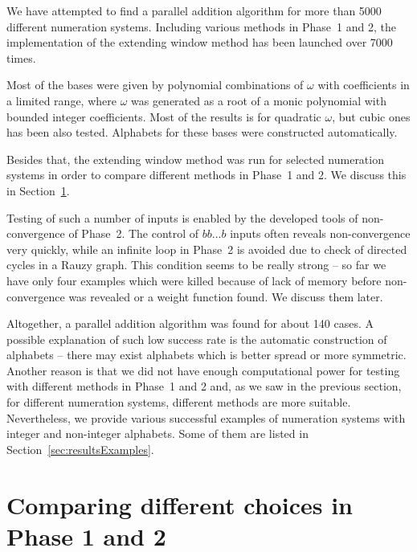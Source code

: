 We have attempted to find a parallel addition algorithm for more than 5000 different numeration systems. Including various methods in Phase~1 and 2, the implementation of the extending window method has been launched over 7000 times. 

Most of the bases were given by polynomial combinations of $\omega$ with coefficients in a limited range, where $\omega$ was generated as a root of a monic polynomial with bounded integer coefficients. Most of the results is for quadratic $\omega$, but cubic ones has been also tested. Alphabets for these bases were constructed automatically. 

Besides that, the extending window method was run for selected numeration systems in order to compare different methods in Phase~1 and 2. We discuss this in Section~\ref{sec:compareMethods}.

Testing of such a number of inputs is enabled by the developed tools of non-convergence of Phase~2. The control of $bb\dots b$ inputs often reveals non-convergence very quickly, while an infinite loop in Phase~2 is avoided due to check of directed cycles in a Rauzy graph. This condition seems to be really strong -- so far we have only four examples which were killed because of lack of memory before non-convergence was revealed or a weight function found. We discuss them later.

Altogether, a parallel addition algorithm was found for about 140 cases. A possible explanation of such low success rate is the automatic construction of alphabets -- there may exist  alphabets which is better spread or more symmetric. Another reason is that we did not have enough computational power for testing with different methods in Phase~1 and 2 and, as we saw in the previous section, for different numeration systems, different methods are more suitable.
Nevertheless, we provide various successful examples of numeration systems with integer and non-integer alphabets. Some of them are listed in Section~\ref{sec:resultsExamples}.

\section{Comparing different choices in Phase 1 and 2}
\label{sec:compareMethods}

\begin{landscape}
	\begin{table}[h]
		\begin{center}
		
		\end{center}
	\caption{Comparing methods in Phase 1}
	\label{tab:resultsPhaseOne}
	\end{table}
\end{landscape}

